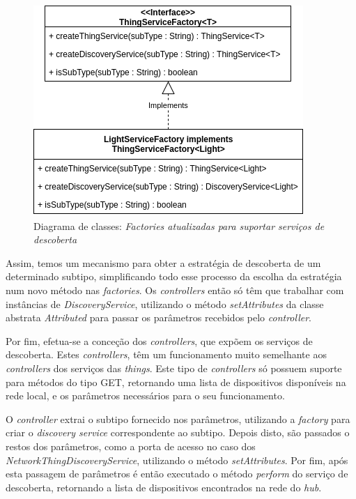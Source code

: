 \begin{figure}[H]
  \centering
        \includegraphics[scale=0.6]{img/hub-factories-discovery.png}
  \caption{Diagrama de classes: \textit{Factories atualizadas para suportar serviços de descoberta}}
\end{figure}

Assim, temos um mecanismo para obter a estratégia de descoberta de um determinado subtipo, simplificando todo esse processo da escolha da estratégia num novo método nas \textit{factories}. Os \textit{controllers} então só têm que trabalhar com instâncias de \textit{DiscoveryService}, utilizando o método \textit{setAttributes} da classe abstrata \textit{Attributed} para passar os parâmetros recebidos pelo \textit{controller}.

Por fim, efetua-se a conceção dos \textit{controllers}, que expõem os serviços de descoberta. Estes \textit{controllers}, têm um funcionamento muito semelhante aos \textit{controllers} dos serviços das \textit{things}. Este tipo de \textit{controllers} só possuem suporte para métodos do tipo GET, retornando uma lista de dispositivos disponíveis na rede local, e os parâmetros necessários para o seu funcionamento.


O \textit{controller} extrai o subtipo fornecido nos parâmetros, utilizando a \textit{factory} para criar o \textit{discovery service} correspondente ao subtipo. Depois disto, são passados o restos dos parâmetros, como a porta de acesso no caso dos \textit{NetworkThingDiscoveryService}, utilizando o método \textit{setAttributes}. Por fim, após esta passagem de parâmetros é então executado o método \textit{perform} do serviço de descoberta, retornando a lista de dispositivos encontrados na rede do \textit{hub}.


